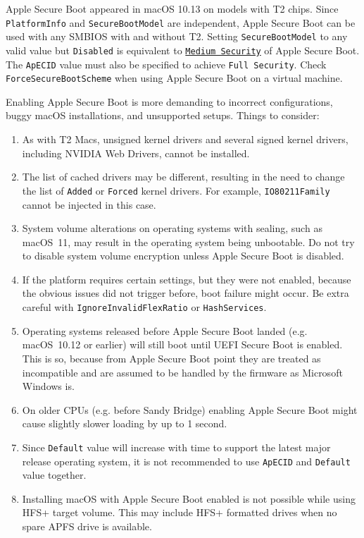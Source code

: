 \documentclass[]{article}
\providecommand{\tightlist}{%
  \setlength{\itemsep}{0pt}\setlength{\parskip}{0pt}}
\begin{document}
\begin{enumerate}
  Apple Secure Boot appeared in macOS 10.13 on models with T2 chips.
  Since \texttt{PlatformInfo} and \texttt{SecureBootModel} are independent,
  Apple Secure Boot can be used with any SMBIOS with and without T2.
  Setting \texttt{SecureBootModel} to any valid value but \texttt{Disabled}
  is equivalent to
  \href{https://support.apple.com/en-us/HT208330}{\texttt{Medium Security}}
  of Apple Secure Boot. The \texttt{ApECID} value must also be specified to
  achieve \texttt{Full Security}. Check \texttt{ForceSecureBootScheme}
  when using Apple Secure Boot on a virtual machine.
  
  Enabling Apple Secure Boot is more demanding to incorrect configurations,
  buggy macOS installations, and unsupported setups. Things to consider:

  \begin{enumerate}
    \tightlist
    \item As with T2 Macs, unsigned kernel drivers and several signed kernel
      drivers, including NVIDIA Web Drivers, cannot be installed.
    \item The list of cached drivers may be different, resulting in the need
      to change the list of \texttt{Added} or \texttt{Forced} kernel drivers.
      For example, \texttt{IO80211Family} cannot be injected in this case.
    \item System volume alterations on operating systems with sealing, such as
      macOS~11, may result in the operating system being unbootable. Do not
      try to disable system volume encryption unless Apple Secure Boot is disabled.
    \item If the platform requires certain settings, but they were not enabled,
      because the obvious issues did not trigger before, boot failure might occur.
      Be extra careful with \texttt{IgnoreInvalidFlexRatio} or \texttt{HashServices}.
    \item Operating systems released before Apple Secure Boot landed (e.g.
      macOS~10.12 or earlier) will still boot until UEFI Secure Boot is enabled.
      This is so, because from Apple Secure Boot point they are treated as incompatible
      and are assumed to be handled by the firmware as Microsoft Windows is.
    \item On older CPUs (e.g. before Sandy Bridge) enabling Apple Secure Boot
      might cause slightly slower loading by up to 1 second.
    \item Since \texttt{Default} value will increase with time to support the latest
      major release operating system, it is not recommended to use \texttt{ApECID}
      and \texttt{Default} value together.
    \item Installing macOS with Apple Secure Boot enabled is not possible while using HFS+ 
      target volume. This may include HFS+ formatted drives when no spare APFS drive is available.
  \end{enumerate}


\end{enumerate}
\end{document}
